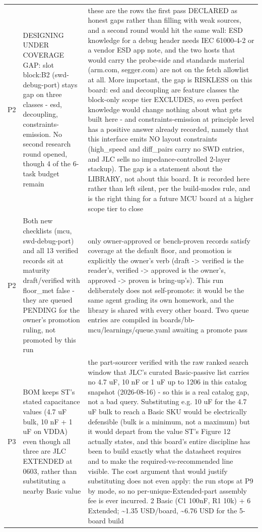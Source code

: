 \documentclass[11pt,a4paper]{article}
\begin{document}
{\begin{longtable}{lp{5.2cm}p{7.2cm}}
P2 & DESIGNING UNDER COVERAGE GAP: slot block:B2 (swd-debug-port) stays gap on three classes - esd, decoupling, constraints-emission. No second research round opened, though 4 of the 6-task budget remain & these are the rows the first pass DECLARED as honest gaps rather than filling with weak sources, and a second round would hit the same wall: ESD knowledge for a debug header needs IEC 61000-4-2 or a vendor ESD app note, and the two hosts that would carry the probe-side and standards material (arm.com, segger.com) are not on the fetch allowlist at all. More important, the gap is RISKLESS on this board: esd and decoupling are feature classes the block-only scope tier EXCLUDES, so even perfect knowledge would change nothing about what gets built here - and constraints-emission at principle level has a positive answer already recorded, namely that this interface emits NO layout constraints (high\_speed and diff\_pairs carry no SWD entries, and JLC sells no impedance-controlled 2-layer stackup). The gap is a statement about the LIBRARY, not about this board. It is recorded here rather than left silent, per the build-modes rule, and is the right thing for a future MCU board at a higher scope tier to close \\
P2 & Both new checklists (mcu, swd-debug-port) and all 13 verified records sit at maturity draft/verified with floor\_met false - they are queued PENDING for the owner's promotion ruling, not promoted by this run & only owner-approved or bench-proven records satisfy coverage at the default floor, and promotion is explicitly the owner's verb (draft -\textgreater{} verified is the reader's, verified -\textgreater{} approved is the owner's, approved -\textgreater{} proven is bring-up's). This run deliberately does not self-promote: it would be the same agent grading its own homework, and the library is shared with every other board. Two queue entries are compiled in boards/bb-mcu/learnings/queue.yaml awaiting a promote pass \\
P3 & BOM keeps ST's stated capacitance values (4.7 uF bulk, 10 nF + 1 uF on VDDA) even though all three are JLC EXTENDED at 0603, rather than substituting a nearby Basic value & the part-sourcer verified with the raw ranked search window that JLC's curated Basic-passive list carries no 4.7 uF, 10 nF or 1 uF up to 1206 in this catalog snapshot (2026-08-16) - so this is a real catalog gap, not a bad query. Substituting e.g. 10 uF for the 4.7 uF bulk to reach a Basic SKU would be electrically defensible (bulk is a minimum, not a maximum) but it would depart from the value ST's Figure 12 actually states, and this board's entire discipline has been to build exactly what the datasheet requires and to make the required-vs-recommended line visible. The cost argument that would justify substituting does not even apply: the run stops at P9 by mode, so no per-unique-Extended-part assembly fee is ever incurred. 2 Basic (C1 100nF, R1 10k) + 6 Extended; \textasciitilde{}1.35 USD/board, \textasciitilde{}6.76 USD for the 5-board build \\

\end{longtable}}
\end{document}
